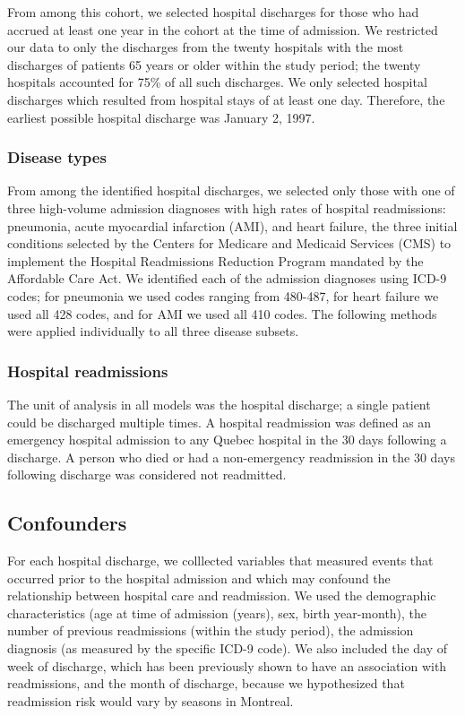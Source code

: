 \documentclass[]{article}
\begin{document}
From among this cohort, we selected hospital discharges for those who had accrued at least one year in the cohort at the time of admission. We restricted our data to only the discharges from the twenty hospitals with the most discharges of patients 65 years or older within the study period; the twenty hospitals accounted for 75\% of all such discharges.  We only selected hospital discharges which resulted from hospital stays of at least one day. Therefore, the earliest possible hospital discharge was January 2, 1997.

\subsubsection{Disease types}
From among the identified hospital discharges, we selected only those with one of three high-volume admission diagnoses with high rates of hospital readmissions: pneumonia, acute myocardial infarction (AMI), and heart failure, the three initial conditions selected by the Centers for Medicare and Medicaid Services (CMS) to implement the Hospital Readmissions Reduction Program mandated by the Affordable Care Act. We identified each of the admission diagnoses using ICD-9 codes; for pneumonia we used codes ranging from 480-487, for heart failure we used all 428 codes, and for AMI we used all 410 codes. The following methods were applied individually to all three disease subsets. 

\subsubsection{Hospital readmissions}
The unit of analysis in all models was the hospital discharge; a single patient could be discharged multiple times. A hospital readmission was defined as an emergency hospital admission to any Quebec hospital in the 30 days following a discharge.  A person who died or had a non-emergency readmission in the 30 days following discharge was considered not readmitted.

\subsection{Confounders}
For each hospital discharge, we colllected variables that measured events that occurred prior to the hospital admission and which may confound the relationship between hospital care and readmission. We used the demographic characteristics (age at time of admission (years), sex, birth year-month), the number of previous readmissions (within the study period), the admission diagnosis (as measured by the specific ICD-9 code). We also included the day of week of discharge, which has been previously shown to have an association with readmissions, and the month of discharge, because we hypothesized that readmission risk would vary by seasons in Montreal.
\end{document}
